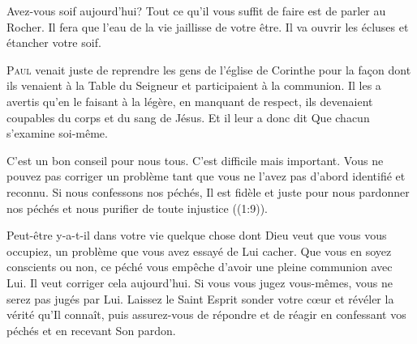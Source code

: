 Avez-vous soif aujourd'hui?
 Tout ce qu'il vous suffit de faire est de parler au Rocher.
 Il fera que l'eau de la vie jaillisse de votre être.
 Il va ouvrir les écluses et étancher votre soif.

\dvrule







\lettrine{P}{aul} venait juste de reprendre
 les gens de l'église de  Corinthe
 pour la fa\c{c}on dont ils venaient à la Table du Seigneur
 et participaient à la communion.
 Il les a avertis qu'en le faisant à la légère,
 en manquant de respect, ils devenaient coupables
 du corps et du sang de Jésus.
 Et il leur a donc dit\frcolon{} 
 \Og Que chacun s'examine soi-même. \Fg{}

C'est un bon conseil pour nous tous. C'est difficile mais important.
 Vous ne pouvez pas corriger un problème tant que vous ne l'avez pas
 d'abord identifié et reconnu.
 \Og Si nous confessons nos péchés, Il est fidèle et juste
 pour nous pardonner nos péchés et nous purifier
 de toute injustice \Fg{} ((1:9)).


Peut-être y-a-t-il dans votre vie quelque chose dont Dieu
 veut que vous vous occupiez, un problème que vous avez essayé
 de Lui cacher.
 Que vous en soyez conscients ou non,
 ce péché vous empêche d'avoir une pleine communion avec Lui.
 Il veut corriger cela aujourd'hui.
 Si vous vous jugez vous-mêmes, vous ne serez pas jugés par Lui.
 Laissez le Saint Esprit sonder votre c\oe{}ur et révéler la vérité
 qu'Il connaît, puis assurez-vous de répondre et de réagir
 en confessant vos péchés et en recevant Son pardon.

